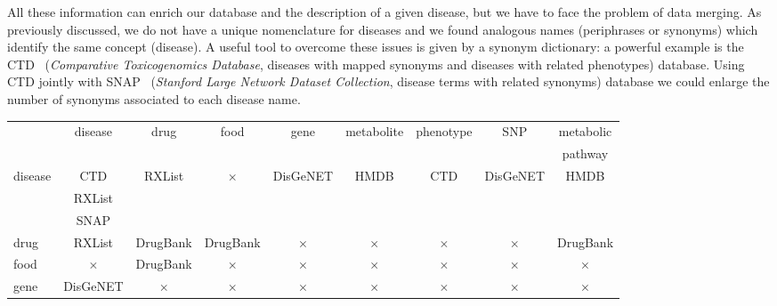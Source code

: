 \documentclass{standalone}
\begin{document}
All these information can enrich our database and the description of a given disease, but we have to face the problem of data merging.
As previously discussed, we do not have a unique nomenclature for diseases and we found analogous names (periphrases or synonyms) which identify the same concept (disease).
A useful tool to overcome these issues is given by a synonym dictionary: a powerful example is the CTD~\cite{CTDdb} (\emph{Comparative Toxicogenomics Database},  diseases with mapped synonyms and  diseases with related phenotypes) database.
Using CTD jointly with SNAP~\cite{biosnapnets} (\emph{Stanford Large Network Dataset Collection},  disease terms with related synonyms) database we could enlarge the number of synonyms associated to each disease name.

\begin{table}
\hspace{-2.25cm}
\begin{tabular}{l!{\color{lightgray}\vrule}c!{\color{lightgray}\vrule}c!{\color{lightgray}\vrule}c!{\color{lightgray}\vrule}c!{\color{lightgray}\vrule}c!{\color{lightgray}\vrule}c!{\color{lightgray}\vrule}c!{\color{lightgray}\vrule}c}
\hline{}
                        & disease             & drug     & food     & gene     & metabolite & phenotype & SNP      & metabolic \\
                        &                     &          &          &          &            &           &          & pathway   \\
disease                 & CTD                 & RXList   & $\times$ & DisGeNET &  HMDB      & CTD       & DisGeNET & HMDB      \\
                        & RXList              &          &          &          &            &           &          &           \\
                        & SNAP                &          &          &          &            &           &          &           \\
\hline
drug                    &       RXList        & DrugBank & DrugBank & $\times$ &  $\times$  &  $\times$ & $\times$ & DrugBank  \\
\hline
food                    &       $\times$      & DrugBank & $\times$ & $\times$ &  $\times$  &  $\times$ & $\times$ &  $\times$ \\
\hline
gene                    &      DisGeNET       & $\times$ & $\times$ & $\times$ &  $\times$  &  $\times$ & $\times$ &  $\times$ \\

\end{tabular}
\end{table}
\end{document}
